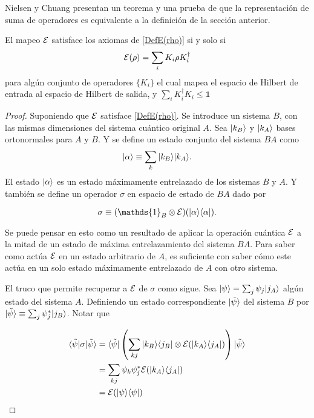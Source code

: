 Nielsen y Chuang {\cite{nielsen_chuang_2010}} presentan un teorema y una prueba de que la representación de suma de operadores es equivalente a la definición de la sección anterior.

\begin{theorem}
    El mapeo $\mathcal{E}$ satisface los axiomas de {\ref{DefE(rho)}} si y solo si 
    \begin{equation}
        \mathcal{E}(\rho)=\sum_i K_i \rho K_i^\dagger
    \end{equation}
    para algún conjunto de operadores $\{K_i\}$ el cual mapea el espacio de Hilbert de entrada al espacio de Hilbert de salida, y $\sum_i K_i^\dagger K_i\le \mathds{1}$
\end{theorem}


\begin{proof}
Suponiendo que $\mathcal{E}$ satisface {\ref{DefE(rho)}}. Se introduce un sistema $B$, con las mismas dimensiones del sistema cuántico original $A$. Sea $|k_B\rangle$ y $|k_A\rangle$ bases ortonormales para $A$ y $B$. Y se define un estado conjunto del sistema $BA$ como \[|\alpha\rangle \equiv \sum_k |k_B\rangle |k_A\rangle. \] El estado $|\alpha\rangle $ es un estado máximamente entrelazado de los sistemas $B$ y $A$. Y también se define un operador $\sigma$ en espacio de estado de $BA$ dado por 

\begin{equation}\label{sigma1}
    \sigma \equiv (\mathds{1}_B\otimes\E)(|\alpha\rala \alpha|).
\end{equation}


Se puede pensar en esto como un resultado de aplicar la operación cuántica $\mathcal{E}$ a la mitad de un estado de máxima entrelazamiento del sistema $BA$. Para saber como actúa $\mathcal{E}$ en un estado arbitrario de $A$, es suficiente con saber cómo este actúa en un solo estado máximamente entrelazado de $A$ con otro sistema.

El truco que permite recuperar a $\mathcal{E}$ de $\sigma$ como sigue. Sea $|\psi\rangle=\sum_j \psi_j |j_A\rangle$ algún estado del sistema $A$. Definiendo un estado correspondiente $|\tilde{\psi}\rangle$ del sistema $B$ por $|\tilde{\psi}\rangle \equiv \sum_j \psi_j^*|j_B\rangle$. Notar que

\begin{equation}
    \begin{split}
        \langle \tilde \psi |\sigma |\tilde{\psi}\rangle&= \langle \tilde \psi |\left(\sum_{kj} |k_B\rangle \langle j_B|\otimes\mathcal{E} (|k_A \rangle \langle j_A|)\right) |\tilde{\psi}\rangle\\
        &=\sum_{kj} \psi_k \psi_j^* \mathcal{E} (|k_A \rangle \langle j_A|)\\
        &=\mathcal{E}(|\psi\rangle \langle\psi|)
    \end{split}
\end{equation}



\end{proof}
